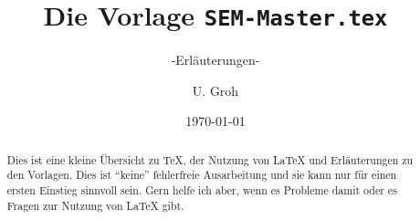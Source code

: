 \documentclass[%
	,ngerman
	,DIV			= calc 
	,toc			= bib
	,abstract		= true
	,parskip			= half+
		]{scrartcl}
\title{Die Vorlage \texttt{SEM-Master.tex}}
\subtitle{-Erläuterungen-}
\date{\today}
\author{U. Groh}
\begin{document}

\maketitle
\tableofcontents
\thispagestyle{empty}

\begin{abstract}
Dies ist eine kleine Übersicht zu \TeX{}, der Nutzung von \LaTeX{} und Erläuterungen zu den Vorlagen.
Dies ist \enquote{keine} fehlerfreie Ausarbeitung und sie kann nur für einen ersten Einstieg sinnvoll sein.
Gern helfe ich aber, wenn es Probleme damit oder es Fragen zur Nutzung von \LaTeX{} gibt.
\end{abstract}








\nocite{voss:2012a,lamport:1986}
\printbibliography
%
\end{document}
